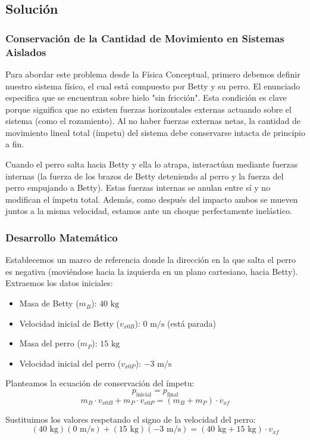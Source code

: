 \documentclass{article}
\begin{document}
\subsection*{Solución}

\subsubsection*{Conservación de la Cantidad de Movimiento en Sistemas Aislados}
Para abordar este problema desde la Física Conceptual, primero debemos definir nuestro sistema físico, el cual está compuesto por Betty y su perro. El enunciado especifica que se encuentran sobre hielo "sin fricción". Esta condición es clave porque significa que no existen fuerzas horizontales externas actuando sobre el sistema (como el rozamiento). Al no haber fuerzas externas netas, la cantidad de movimiento lineal total (ímpetu) del sistema debe conservarse intacta de principio a fin.

Cuando el perro salta hacia Betty y ella lo atrapa, interactúan mediante fuerzas internas (la fuerza de los brazos de Betty deteniendo al perro y la fuerza del perro empujando a Betty). Estas fuerzas internas se anulan entre sí y no modifican el ímpetu total. Además, como después del impacto ambos se mueven juntos a la misma velocidad, estamos ante un choque perfectamente inelástico.

\subsubsection*{Desarrollo Matemático}
Establecemos un marco de referencia donde la dirección en la que salta el perro es negativa (moviéndose hacia la izquierda en un plano cartesiano, hacia Betty). 
Extraemos los datos iniciales:
\begin{itemize}
    \item Masa de Betty ($m_B$): $40 \text{ kg}$
    \item Velocidad inicial de Betty ($v_{x0B}$): $0 \text{ m/s}$ (está parada)
    \item Masa del perro ($m_P$): $15 \text{ kg}$
    \item Velocidad inicial del perro ($v_{x0P}$): $-3 \text{ m/s}$
\end{itemize}

Planteamos la ecuación de conservación del ímpetu:
$$p_{\text{inicial}} = p_{\text{final}}$$
$$m_B \cdot v_{x0B} + m_P \cdot v_{x0P} = (m_B + m_P) \cdot v_{xf}$$

Sustituimos los valores respetando el signo de la velocidad del perro:
$$(40 \text{ kg})(0 \text{ m/s}) + (15 \text{ kg})(-3 \text{ m/s}) = (40 \text{ kg} + 15 \text{ kg}) \cdot v_{xf}$$
\end{document}
